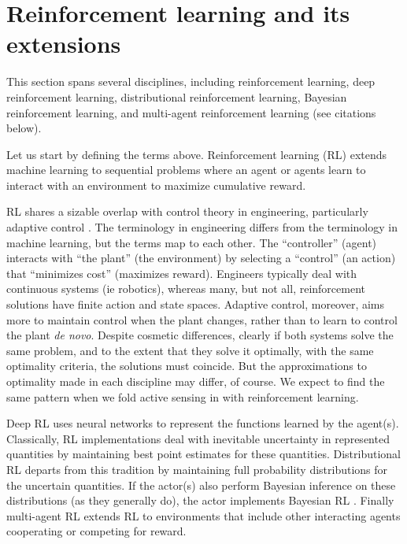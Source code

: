 \documentclass{article}
\begin{document}
\section{Reinforcement learning and its extensions}

This section spans several disciplines, including reinforcement
learning, deep reinforcement learning, distributional reinforcement
learning, Bayesian reinforcement learning, and multi-agent
reinforcement learning (see citations below).

Let us start by defining the terms above.  Reinforcement learning (RL)
\cite{sutton2018reinforcement, kaelbling1996reinforcement} extends
machine learning to sequential problems where an agent or agents learn
to interact with an environment to maximize cumulative reward.

RL shares a sizable overlap with control theory in engineering,
particularly adaptive control \cite{aastrom2013adaptive,
  khan2012reinforcement}.  The terminology in engineering differs from
the terminology in machine learning, but the terms map to each other.
The ``controller'' (agent) interacts with ``the plant'' (the
environment) by selecting a ``control'' (an action) that ``minimizes
cost'' (maximizes reward).  Engineers typically deal with continuous
systems (ie robotics), whereas many, but not all, reinforcement
solutions have finite action and state spaces.  Adaptive control,
moreover, aims more to maintain control when the plant changes, rather
than to learn to control the plant \emph{de novo}.  Despite cosmetic
differences, clearly if both systems solve the same problem, and to
the extent that they solve it optimally, with the same optimality
criteria, the solutions must coincide.  But the approximations to
optimality made in each discipline may differ, of course.  We expect
to find the same pattern when we fold active sensing in with
reinforcement learning.

Deep RL \cite{li2017deep} uses neural networks to represent the
functions learned by the agent(s).  Classically, RL implementations
deal with inevitable uncertainty in represented quantities by
maintaining best point estimates for these quantities.  Distributional
RL \cite{osband2018randomized} departs from this tradition by
maintaining full probability distributions for the uncertain
quantities. If the actor(s) also perform Bayesian inference on these
distributions (as they generally do), the actor implements Bayesian RL
\cite{ghavamzadeh2016bayesian}.  Finally multi-agent RL
\cite{bucsoniu2010multi} extends RL to environments that include other
interacting agents cooperating or competing for reward.
\end{document}
